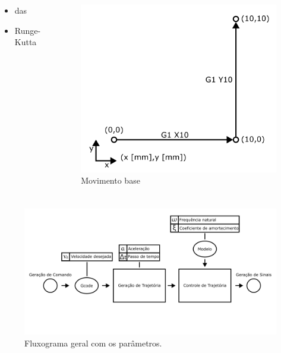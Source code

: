 \documentclass[aspectratio=169]{beamer}
\begin{document}
\begin{frame}
  \frametitle{\insertsection}
  \begin{columns}
    \begin{column}{.3\textwidth}
      \begin{itemize}
        \item das
        \item Runge-Kutta
      \end{itemize}
    \end{column}
    \begin{column}{.7\textwidth}
      \begin{figure}[H]
        \centering
        \caption{Movimento base}
        \includegraphics[width=.7\textwidth]{base_mov}
    
        \label{fig:base_mov}
      \end{figure}
    \end{column}
  \end{columns}
\end{frame}

\begin{frame}
  \frametitle{\insertsection}
  \begin{figure}[H]
    \centering
    \caption{Fluxograma geral com os parâmetros.}
    \includegraphics[width=.9\textwidth]{fluxo_geral_var}

    \label{fig:fluxo_geral_var}
\end{figure}
\end{frame}
\end{document}
